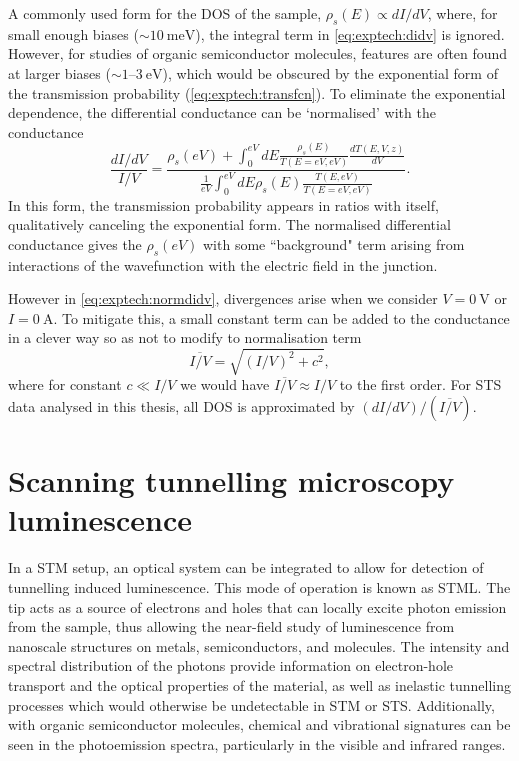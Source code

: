 A commonly used form for the \ac{DOS} of the sample, $\rho_s(E) \propto dI/dV $, where, for small enough biases ($\sim \SI{10}{\milli\electronvolt}$), the integral term in \autoref{eq:exptech:didv} is ignored. However, for studies of organic semiconductor molecules, features are often found at larger biases ($\sim 1$--$\SI{3}{\electronvolt}$), which would be obscured by the exponential form of the transmission probability (\autoref{eq:exptech:transfcn}). To eliminate the exponential dependence, the differential conductance can be `normalised' with the conductance
\begin{equation} \label{eq:exptech:normdidv}
\frac{dI/dV}{I/V} = \frac{\rho_s(eV) + \int_0 ^{eV} dE \frac{\rho_s(E)}{T(E=eV,eV)} \frac{dT(E,V,z)}{dV}}{ \frac{1}{eV} \int_0^{eV} dE \rho_s(E) \frac{T(E,eV)}{T(E=eV,eV)}}.
\end{equation}
In this form, the transmission probability appears in ratios with itself, qualitatively canceling the exponential form. The normalised differential conductance gives the $\rho_s(eV)$ with some ``background" term arising from interactions of the wavefunction with the electric field in the junction.

However in \autoref{eq:exptech:normdidv}, divergences arise when we consider $V=\SI{0}{\volt}$ or $I= \SI{0}{\ampere}$. To mitigate this, a small constant term can be added to the conductance in a clever way so as not to modify to normalisation term
\begin{equation}
    \overline{I/V} = \sqrt{(I/V)^2 + c^2},
\end{equation}
where for constant $c\ll I/V$ we would have $\overline{I/V} \approx I/V$ to the first order. For \ac{STS} data analysed in this thesis, all \ac{DOS} is approximated by $ (dI/dV) / (\overline{I/V})$.

\section{Scanning tunnelling microscopy luminescence}

In a \ac{STM} setup, an optical system can be integrated to allow for detection of tunnelling induced luminescence. This mode of operation is known as \acf{STML}. The tip acts as a source of electrons and holes that can locally excite photon emission from the sample, thus allowing the near-field study of luminescence from nanoscale structures on metals, semiconductors, and molecules. The intensity and spectral distribution of the photons provide information on electron-hole transport and the optical properties of the material, as well as inelastic tunnelling processes which would otherwise be undetectable in \ac{STM} or \ac{STS}. Additionally, with organic semiconductor molecules, chemical and vibrational signatures can be seen in the photoemission spectra, particularly in the visible and infrared ranges.

